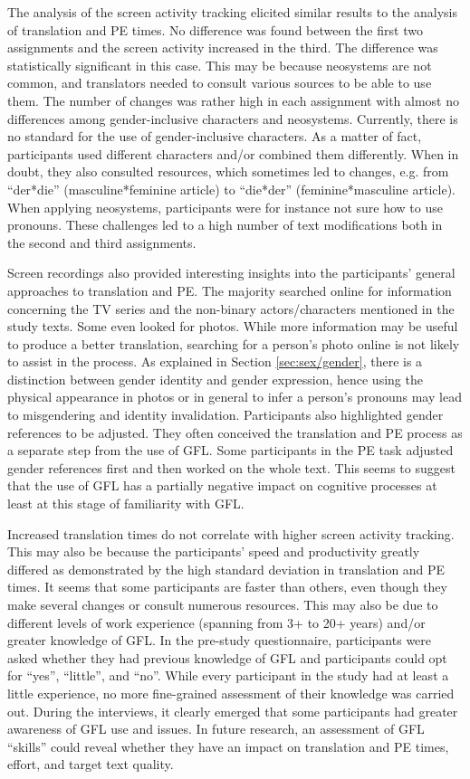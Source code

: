 The analysis of the screen activity tracking elicited similar results to the analysis of translation and PE times. No difference was found between the first two assignments and the screen activity increased in the third. The difference was statistically significant in this case. This may be because neosystems are not common, and translators needed to consult various sources to be able to use them. The number of changes was rather high in each assignment with almost no differences among gender-inclusive characters and neosystems. Currently, there is no standard for the use of gender-inclusive characters. As a matter of fact, participants used different characters and/or combined them differently. When in doubt, they also consulted resources, which sometimes led to changes, e.g. from ``der*die'' (masculine*feminine article) to ``die*der'' (feminine*masculine article). When applying neosystems, participants were for instance not sure how to use pronouns. These challenges led to a high number of text modifications both in the second and third assignments.

Screen recordings also provided interesting insights into the participants' general approaches to translation and PE. The majority searched online for information concerning the TV series and the non-binary actors/characters mentioned in the study texts. Some even looked for photos. While more information may be useful to produce a better translation, searching for a person's photo online is not likely to assist in the process. As explained in Section \ref{sec:sex/gender}, there is a distinction between gender identity and gender expression, hence using the physical appearance in photos or in general to infer a person's pronouns may lead to misgendering and identity invalidation. Participants also highlighted gender references to be adjusted. They often conceived the translation and PE process as a separate step from the use of GFL. Some participants in the PE task adjusted gender references first and then worked on the whole text. This seems to suggest that the use of GFL has a partially negative impact on cognitive processes at least at this stage of familiarity with GFL.


Increased translation times do not correlate with higher screen activity tracking. This may also be because the participants' speed and productivity greatly differed as demonstrated by the high standard deviation in translation and PE times. It seems that some participants are faster than others, even though they make several changes or consult numerous resources. This may also be due to different levels of work experience (spanning from 3+ to 20+ years) and/or greater knowledge of GFL. In the pre-study questionnaire, participants were asked whether they had previous knowledge of GFL and participants could opt for ``yes'', ``little'', and ``no''. While every participant in the study had at least a little experience, no more fine-grained assessment of their knowledge was carried out. During the interviews, it clearly emerged that some participants had greater awareness of GFL use and issues. In future research, an assessment of GFL ``skills'' could reveal whether they have an impact on translation and PE times, effort, and target text quality. 

